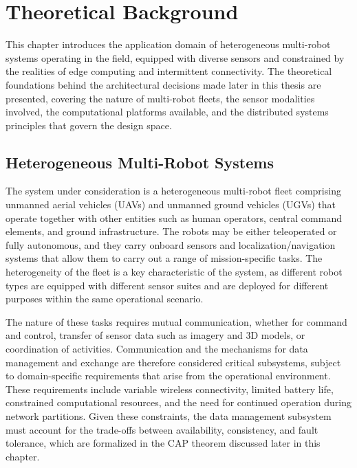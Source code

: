 
\chapter{Theoretical Background} \label{ch:theoretical-background}

This chapter introduces the application domain of heterogeneous multi-robot systems operating in the field, equipped with diverse sensors and constrained by the realities of edge computing and intermittent connectivity. The theoretical foundations behind the architectural decisions made later in this thesis are presented, covering the nature of multi-robot fleets, the sensor modalities involved, the computational platforms available, and the distributed systems principles that govern the design space.

\section{Heterogeneous Multi-Robot Systems} \label{sec:multi-robot-systems}

The system under consideration is a heterogeneous multi-robot fleet comprising unmanned aerial vehicles (UAVs) and unmanned ground vehicles (UGVs) that operate together with other entities such as human operators, central command elements, and ground infrastructure. The robots may be either teleoperated or fully autonomous, and they carry onboard sensors and localization/navigation systems that allow them to carry out a range of mission-specific tasks. The heterogeneity of the fleet is a key characteristic of the system, as different robot types are equipped with different sensor suites and are deployed for different purposes within the same operational scenario.

The nature of these tasks requires mutual communication, whether for command and control, transfer of sensor data such as imagery and 3D models, or coordination of activities. Communication and the mechanisms for data management and exchange are therefore considered critical subsystems, subject to domain-specific requirements that arise from the operational environment. These requirements include variable wireless connectivity, limited battery life, constrained computational resources, and the need for continued operation during network partitions. Given these constraints, the data management subsystem must account for the trade-offs between availability, consistency, and fault tolerance, which are formalized in the CAP theorem discussed later in this chapter.

